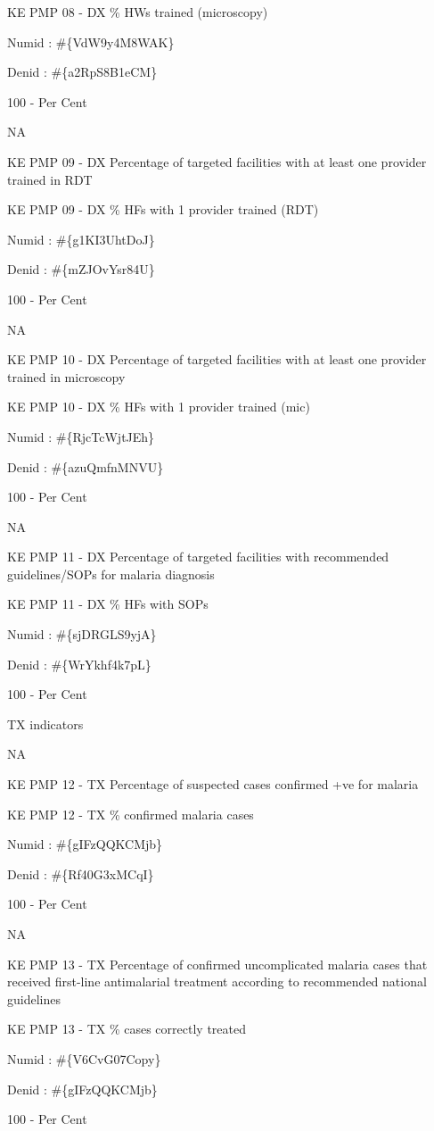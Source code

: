 \documentclass[]{book}
\begin{document}
KE PMP 08 - DX \% HWs trained (microscopy)

Numid : \#\{VdW9y4M8WAK\}

Denid : \#\{a2RpS8B1eCM\}

100 - Per Cent

NA

KE PMP 09 - DX Percentage of targeted facilities with at least one provider trained in RDT

KE PMP 09 - DX \% HFs with 1 provider trained (RDT)

Numid : \#\{g1KI3UhtDoJ\}

Denid : \#\{mZJOvYsr84U\}

100 - Per Cent

NA

KE PMP 10 - DX Percentage of targeted facilities with at least one provider trained in microscopy

KE PMP 10 - DX \% HFs with 1 provider trained (mic)

Numid : \#\{RjcTcWjtJEh\}

Denid : \#\{azuQmfnMNVU\}

100 - Per Cent

NA

KE PMP 11 - DX Percentage of targeted facilities with recommended guidelines/SOPs for malaria diagnosis

KE PMP 11 - DX \% HFs with SOPs

Numid : \#\{sjDRGLS9yjA\}

Denid : \#\{WrYkhf4k7pL\}

100 - Per Cent

TX indicators

NA

KE PMP 12 - TX Percentage of suspected cases confirmed +ve for malaria

KE PMP 12 - TX \% confirmed malaria cases

Numid : \#\{gIFzQQKCMjb\}

Denid : \#\{Rf40G3xMCqI\}

100 - Per Cent

NA

KE PMP 13 - TX Percentage of confirmed uncomplicated malaria cases that received first-line antimalarial treatment according to recommended national guidelines

KE PMP 13 - TX \% cases correctly treated

Numid : \#\{V6CvG07Copy\}

Denid : \#\{gIFzQQKCMjb\}

100 - Per Cent
\end{document}
